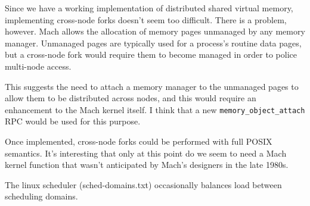 \documentclass{article}
\def\netmsg{{\tt netmsg}\xspace}
\def\moinit{{\tt memory_object_init}\xspace}
\begin{document}
Since we have a working implementation of distributed shared virtual
memory, implementing cross-node forks doesn't seem too difficult.
There is a problem, however.  Mach allows the allocation of memory
pages unmanaged by any memory manager.  Unmanaged pages are typically
used for a process's routine data pages, but a cross-node fork would
require them to become managed in order to police multi-node access.

This suggests the need to attach a memory manager to the unmanaged
pages to allow them to be distributed across nodes, and this would
require an enhancement to the Mach kernel itself.  I think that
a new {\tt memory_object_attach} RPC would be used for this
purpose.

Once implemented, cross-node forks could be performed with full POSIX
semantics.  It's interesting that only at this point do we seem
to need a Mach kernel function that wasn't anticipated by Mach's
designers in the late 1980s.

The linux scheduler (sched-domains.txt) occasionally balances
load between scheduling domains.

\begin{comment}
\section{Blocking Behavior of {\tt mach_msg()}}

An issue with Mach's design caused me no little bit of grief.
Mach's {\tt mach_msg()} (as I read the documentation),
allows for non-blocking sends: according to \cite{interfaces}:

\begin{quote}
MACH_SEND_TIMEOUT

The {\it timeout} argument should specify a maximum time (in
milliseconds) for the call to block before giving up. If the message
can’t be queued before the timeout interval elapses, then the call
returns MACH_SEND_TIMED_OUT. A zero timeout is legitimate.
\end{quote}

In fact, a call to {\tt mach_msg()} can block indefinitely, even if a
{\it timeout} value of zero is specified!  The problem occurs when the
message is an RPC directed at the kernel which in turns triggers other
RPCs.  The memory manager is a big offender here.  Sending a {\tt
  vm_map} message to the kernel will cause the kernel to send a
\moinit message to the memory manager, then block waiting for a reply.
If both the {\tt vm_map} and the \moinit were handled by a single
thread in \netmsg, then that thread would block indefinitely,
requiring considerable additional complexity in \netmsg to ensure that
additional threads are always available in case calls to {\tt
  mach_msg()} block.

The consensus on the Hurd mailing list leaned in favor of this being
legitimate behavior, reading the documentation as guaranteeing that
the timeout applied to the send, and not to the underlying RPC.  In
any event, changing this behavior would require quite a bit of work on
the Mach kernel.

\end{comment}
\end{document}
